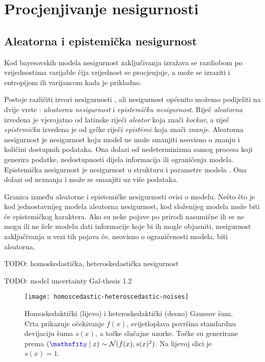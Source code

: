 \documentclass[utf8, diplomski, lmodern]{fer}
\begin{document}
\chapter{Procjenjivanje nesigurnosti}




\section{Aleatorna i epistemička nesigurnost}

Kod bayesovskih modela nesigurnost zaključivanja izražava se razdiobom po vrijednostima varijable čija vrijednost se procjenjuje, a može se izraziti i entropijom ili varijancom kada je prikladno.

Postoje različiti izvori nesigurnosti \citep{Kennedy:2002:BCCM}, ali nesigurnost općenito možemo podijeliti na dvije vrste \citep{Kiureghian:2009:AEDM}: \emph{aleatornu nesigurnost} i \emph{epistemičku nesigurnost}. Riječ \textit{aleatorna} izvedena je vjerojatno od latinske riječi \textit{aleator} \citep{Gal:2016:UDL} koja znači \textit{kockar}, a riječ \textit{epistemička} izvedena je od grčke riječi \textit{epist\={e}m\={e}} koja znači \textit{znanje}. Aleatorna nesigurnost je nesigurnost koju model ne može smanjiti neovisno o znanju i količini dostupnih podataka. Ona dolazi od nedeterminizma samog procesa koji generira podatke, nedostupnosti dijela informacija ili ograničenja modela. Epistemička nesigurnost je nesigurnost u strukturu i parametre modela \cite{Gal:2016:UDL}. Ona dolazi od neznanja i može se smanjiti uz više podataka.

Granica između aleatorne i epistemičke nesigurnosti ovisi o modelu. Nešto što je kod jednostavnijeg modela aleatorna nesigurnost, kod složenijeg modela može biti će epistemičkog karaktera. Ako su neke pojave po prirodi nasumične ili se ne mogu ili ne žele modelu dati informacije koje bi ih mogle objasniti, nesigurnost zaključivanja u vezi tih pojava će, neovisno o ograničenosti modela, biti aleatorna.

TODO: homoskedastička, heteroskedastička nesigurnost

TODO: model uncertainty Gal-thesis 1.2

\the{}\font\newline %
\the{}\font\newline %

\the\textwidth

\begin{figure}
	\centering
	\texttt{[image: homoscedastic-heteroscedastic-noises]}
	\caption{Homoskedaktički (lijevo) i heteroskedaktički (desno) Gaussov šum.  Crta prikazuje očekivanje $f(x)$, svijetloplava površina standardnu devijaciju šuma $s(x)$, a točke slučajne uzorke. Točke su generirane prema $(\rvar y\mid x) \sim \mathcal{N}(f(x),s(x)^2)$. Na lijevoj slici je $s(x)=1$.}
	\label{fig:homoscedastic-heteroscedastic-noises}
\end{figure}
\end{document}
